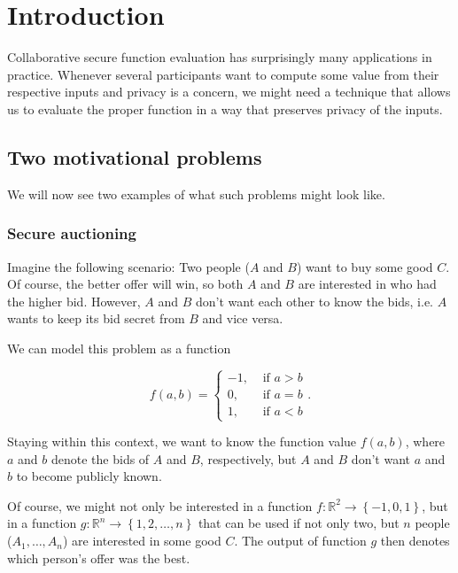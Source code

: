 \section{Introduction}
\label{sec:introduction}

Collaborative secure function evaluation has surprisingly many applications in practice. Whenever several participants want to compute some value from their respective inputs and privacy is a concern, we might need a technique that allows us to evaluate the proper function in a way that preserves privacy of the inputs. 

\subsection{Two motivational problems}
\label{sec:motivational-problems}

We will now see two examples of what such problems might look like.

\subsubsection{Secure auctioning}
\label{sec:intro-problem-secure-auctioning}

Imagine the following scenario: Two people ($A$ and $B$) want to buy some good $C$. Of course, the better offer will win, so both $A$ and $B$ are interested in who had the higher bid. However, $A$ and $B$ don't want each other to know the bids, i.e. $A$ wants to keep its bid secret from $B$ and vice versa. 

We can model this problem as a function

\begin{equation}
  f(a,b)=
  \begin{cases}
    -1, & \text{ if } a>b \\
    0, & \text{ if } a=b \\
    1, & \text{ if } a<b
  \end{cases}.
\end{equation}

Staying within this context, we want to know the function value $f(a,b)$, where $a$ and $b$ denote the bids of $A$ and $B$, respectively, but $A$ and $B$ don't want $a$ and $b$ to become publicly known.

Of course, we might not only be interested in a function $f:\mathbb R ^2\rightarrow \left\{ -1,0,1 \right\}$, but in a function $g: \mathbb R ^n \rightarrow \left\{ 1,2,\dots,n \right\}$ that can be used if not only two, but $n$ people ($A_1,\dots,A_n$) are interested in some good $C$. The output of function $g$ then denotes which person's offer was the best.

